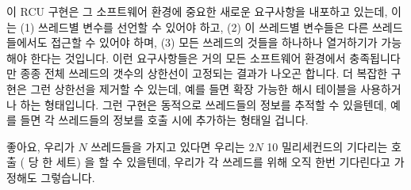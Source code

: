 이 RCU 구현은 그 소프트웨어 환경에 중요한 새로운 요구사항을 내포하고 있는데,
이는 (1) 쓰레드별 변수를 선언할 수 있어야 하고, (2) 이 쓰레드별 변수들은 다른
쓰레드들에서도 접근할 수 있어야 하며, (3) 모든 쓰레드의 것들을 하나하나
열거하기가 가능해야 한다는 것입니다.
이런 요구사항들은 거의 모든 소프트웨어 환경에서 충족됩니다만 종종 전체 쓰레드의
갯수의 상한선이 고정되는 결과가 나오곤 합니다.
더 복잡한 구현은 그런 상한선을 제거할 수 있는데, 예를 들면 확장 가능한 해시
테이블을 사용하거나 하는 형태입니다.
그런 구현은 동적으로 쓰레드들의 정보를 추적할 수 있을텐데, 예를 들면 각
쓰레드들의 정보를  호출 시에 추가하는 형태일 겁니다.
\iffalse

This RCU implementation imposes important new requirements on its
software environment, namely, (1) that it be possible to declare
per-thread variables, (2) that these per-thread variables be accessible
from other threads, and (3) that it is possible to enumerate all threads.
These requirements can be met in almost all software environments,
but often result in fixed upper bounds on the number of threads.
More-complex implementations might avoid such bounds, for example, by using
expandable hash tables.
Such implementations might dynamically track threads, for example, by
adding them on their first call to \co{rcu_read_lock()}.
\fi

\QuickQuiz{}
	좋아요, 우리가 $N$ 쓰레드들을 가지고 있다면 우리는 $2N$ 10 밀리세컨드의
	기다리는 호출 ( 당 한 세트) 을 할 수
	있을텐데, 우리가 각 쓰레드를 위해 오직 한번 기다린다고 가정해도
	그렇습니다.
	\iffalse

